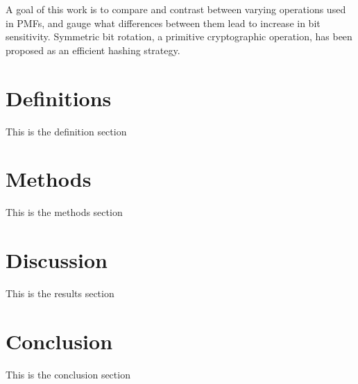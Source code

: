 \documentclass{article}
\begin{document}
A goal of this work is to compare and contrast between  varying operations used in PMFs, and gauge what differences between them lead to increase in bit sensitivity. Symmetric bit rotation, a primitive cryptographic operation, has been proposed as an efficient hashing strategy\citep{pieprzyk1999fast}.


\section{Definitions}

This is the definition section

\section{Methods}

This is the methods section

\section{Discussion}

This is the results section



\section{Conclusion}
This is the conclusion section



\end{document}
